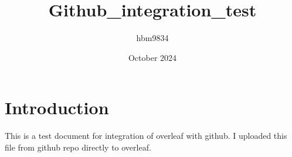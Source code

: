 \documentclass{article}
\title{Github_integration_test}
\author{hbm9834 }
\date{October 2024}
\begin{document}
\maketitle

\section{Introduction}
This is a test document for integration of overleaf with github. I uploaded this file from github repo directly to overleaf. 
\end{document}

